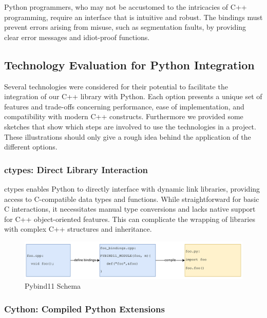Python programmers, who may not be accustomed to the intricacies of C++ programming, require an interface that is intuitive and robust. The bindings must prevent errors arising from misuse, such as segmentation faults, by providing clear error messages and idiot-proof functions.

\subsection{Technology Evaluation for Python Integration}

Several technologies were considered for their potential to facilitate the integration of our C++ library with Python. Each option presents a unique set of features and trade-offs concerning performance, ease of implementation, and compatibility with modern C++ constructs.
Furthermore we provided some sketches that show which steps are involved to use the technologies in a project. These illustrations should only give a rough idea behind the application of the different options.

\subsubsection{ctypes: Direct Library Interaction}

ctypes enables Python to directly interface with dynamic link libraries, providing access to C-compatible data types and functions. While straightforward for basic C interactions, it necessitates manual type conversions and lacks native support for C++ object-oriented features. This can complicate the wrapping of libraries with complex C++ structures and inheritance.

\begin{figure}[htpb]
    \centering
    \includegraphics[width=\textwidth]{figures/pybind_schema.png}
    \caption{Pybind11 Schema}
    \label{fig:pybind11-schema}
\end{figure}



\subsubsection{Cython: Compiled Python Extensions}


